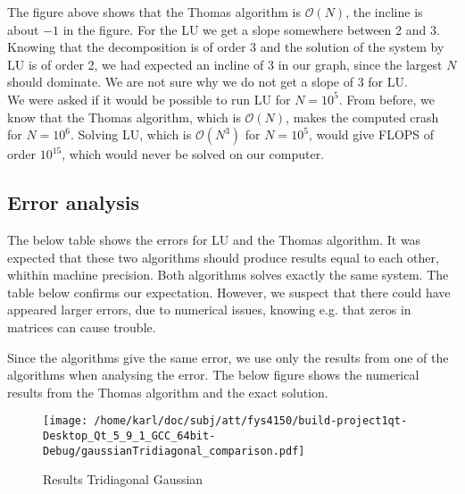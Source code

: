 \documentclass{article}
\begin{document}
The figure above shows that the Thomas algorithm is $\mathcal{O}(N)$, the incline is about $-1$ in the figure. For the LU we get a slope somewhere between 2 and 3. Knowing that the decomposition is of order 3 and the solution of the system by LU is of order 2, we had expected an incline of 3 in our graph, since the largest $N$ should dominate. We are not sure why we do not get a slope of 3 for LU. \\

We were asked if it would be possible to run LU for $N=10^5.$ From before, we know that the Thomas algorithm, which is $\mathcal{O}(N)$, makes the computed crash for $N = 10^6$. Solving LU, which is $\mathcal{O}(N^3)$ for $N = 10^5$, would give FLOPS of order $10^15$, which would never be solved on our computer.

\subsection{Error analysis}
The below table shows the errors for LU and the Thomas algorithm. It was expected that these two algorithms should produce results equal to each other, whithin machine precision. Both algorithms solves exactly the same system. The table below confirms our expectation. However, we suspect that there could have appeared larger errors, due to numerical issues, knowing e.g. that zeros in matrices can cause trouble.

\begin{minipage}{.49\textwidth} %
	
\end{minipage}\hfill
\begin{minipage}{.49\textwidth}
	
\end{minipage}\hfill

Since the algorithms give the same error, we use only the results from one of the algorithms when analysing the error. The below figure shows the numerical results from the Thomas algorithm and the exact solution.

\begin{figure}[H]
	\centering
	\texttt{[image: /home/karl/doc/subj/att/fys4150/build-project1qt-Desktop\_Qt\_5\_9\_1\_GCC\_64bit-Debug/gaussianTridiagonal\_comparison.pdf]}
	\caption{Results Tridiagonal Gaussian}
\end{figure}
\end{document}
